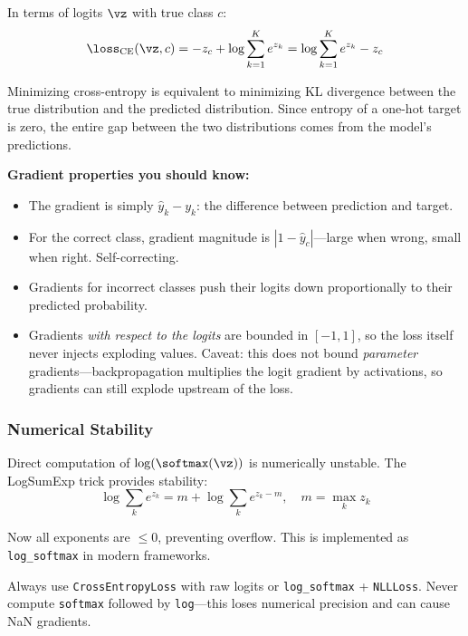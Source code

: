 In terms of logits $\vz$ with true class $c$:
\begin{equation}
\loss_{\text{CE}}(\vz, c) = -z_c + \log\sum_{k=1}^{K} e^{z_k} = \log\sum_{k=1}^{K} e^{z_k} - z_c
\label{eq:ce_logits}
\end{equation}

\begin{keyinsight}
Minimizing cross-entropy is equivalent to minimizing KL divergence between the true distribution and the predicted distribution. Since entropy of a one-hot target is zero, the entire gap between the two distributions comes from the model's predictions.
\end{keyinsight}

\textbf{Gradient properties you should know:}
\begin{itemize}
    \item The gradient is simply $\hat{y}_k - y_k$: the difference between prediction and target.
    \item For the correct class, gradient magnitude is $|1 - \hat{y}_c|$---large when wrong, small when right. Self-correcting.
    \item Gradients for incorrect classes push their logits down proportionally to their predicted probability.
    \item Gradients \textit{with respect to the logits} are bounded in $[-1, 1]$, so the loss itself never injects exploding values. Caveat: this does not bound \textit{parameter} gradients---backpropagation multiplies the logit gradient by activations, so gradients can still explode upstream of the loss.
\end{itemize}

\subsubsection{Numerical Stability}

Direct computation of $\log(\softmax(\vz))$ is numerically unstable. The LogSumExp trick provides stability:
\begin{equation}
\log\sum_k e^{z_k} = m + \log\sum_k e^{z_k - m}, \quad m = \max_k z_k
\end{equation}

Now all exponents are $\leq 0$, preventing overflow. This is implemented as \texttt{log\_softmax} in modern frameworks.

\begin{warningbox}
Always use \texttt{CrossEntropyLoss} with raw logits or \texttt{log\_softmax} + \texttt{NLLLoss}. Never compute \texttt{softmax} followed by \texttt{log}---this loses numerical precision and can cause NaN gradients.
\end{warningbox}

